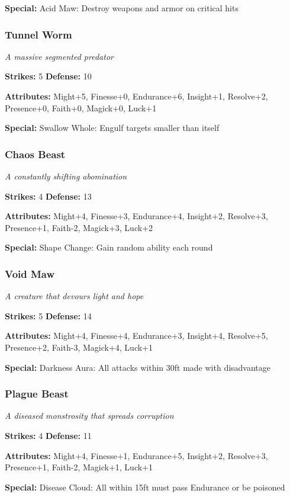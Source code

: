 \documentclass[10pt,twoside]{article}
\begin{document}
\textbf{Special:} Acid Maw: Destroy weapons and armor on critical hits

\subsubsection{Tunnel Worm}
\textit{A massive segmented predator}

\textbf{Strikes:} 5 \quad \textbf{Defense:} 10

\textbf{Attributes:} Might+5, Finesse+0, Endurance+6, Insight+1, Resolve+2, Presence+0, Faith+0, Magick+0, Luck+1

\textbf{Special:} Swallow Whole: Engulf targets smaller than itself

\subsubsection{Chaos Beast}
\textit{A constantly shifting abomination}

\textbf{Strikes:} 4 \quad \textbf{Defense:} 13

\textbf{Attributes:} Might+4, Finesse+3, Endurance+4, Insight+2, Resolve+3, Presence+1, Faith-2, Magick+3, Luck+2

\textbf{Special:} Shape Change: Gain random ability each round

\subsubsection{Void Maw}
\textit{A creature that devours light and hope}

\textbf{Strikes:} 5 \quad \textbf{Defense:} 14

\textbf{Attributes:} Might+4, Finesse+4, Endurance+3, Insight+4, Resolve+5, Presence+2, Faith-3, Magick+4, Luck+1

\textbf{Special:} Darkness Aura: All attacks within 30ft made with disadvantage

\subsubsection{Plague Beast}
\textit{A diseased monstrosity that spreads corruption}

\textbf{Strikes:} 4 \quad \textbf{Defense:} 11

\textbf{Attributes:} Might+4, Finesse+1, Endurance+5, Insight+2, Resolve+3, Presence+1, Faith-2, Magick+1, Luck+1

\textbf{Special:} Disease Cloud: All within 15ft must pass Endurance or be poisoned
\end{document}
